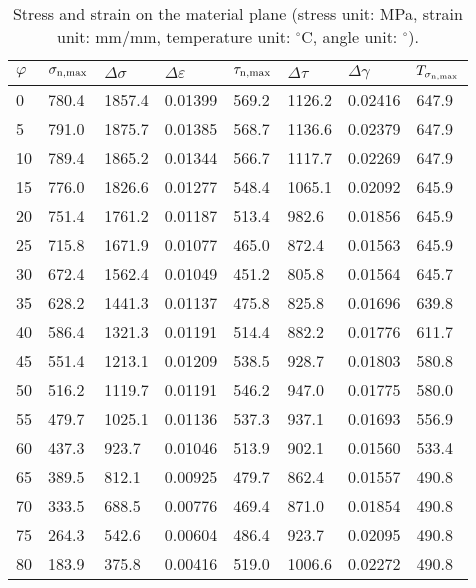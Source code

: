 \begin{table}[htbp]
  \centering
  \caption{Stress and strain on the material plane (stress unit: MPa, strain unit: mm/mm, temperature unit: $^\circ$C, angle unit: $^\circ$). }
    \begin{tabular}{p{1.5cm}p{1.5cm}p{1.5cm}p{1.5cm}p{1.5cm}p{1.5cm}p{1.5cm}p{1.5cm}}
    \toprule
    $\varphi$ & $\sigma_{\rm{n,max}}$ & $\Delta \sigma$ & $\Delta \varepsilon$ & $\tau_{\rm{n,max}}$ & $\Delta \tau$ & $\Delta \gamma$ & $T_{\sigma_{\rm{n,max}}}$ \\
    \midrule
    0     & 780.4  & 1857.4  & 0.01399  & 569.2  & 1126.2  & 0.02416  & 647.9  \\
    5     & 791.0  & 1875.7  & 0.01385  & 568.7  & 1136.6  & 0.02379  & 647.9  \\
    10    & 789.4  & 1865.2  & 0.01344  & 566.7  & 1117.7  & 0.02269  & 647.9  \\
    15    & 776.0  & 1826.6  & 0.01277  & 548.4  & 1065.1  & 0.02092  & 645.9  \\
    20    & 751.4  & 1761.2  & 0.01187  & 513.4  & 982.6  & 0.01856  & 645.9  \\
    25    & 715.8  & 1671.9  & 0.01077  & 465.0  & 872.4  & 0.01563  & 645.9  \\
    30    & 672.4  & 1562.4  & 0.01049  & 451.2  & 805.8  & 0.01564  & 645.7  \\
    35    & 628.2  & 1441.3  & 0.01137  & 475.8  & 825.8  & 0.01696  & 639.8  \\
    40    & 586.4  & 1321.3  & 0.01191  & 514.4  & 882.2  & 0.01776  & 611.7  \\
    45    & 551.4  & 1213.1  & 0.01209  & 538.5  & 928.7  & 0.01803  & 580.8  \\
    50    & 516.2  & 1119.7  & 0.01191  & 546.2  & 947.0  & 0.01775  & 580.0  \\
    55    & 479.7  & 1025.1  & 0.01136  & 537.3  & 937.1  & 0.01693  & 556.9  \\
    60    & 437.3  & 923.7  & 0.01046  & 513.9  & 902.1  & 0.01560  & 533.4  \\
    65    & 389.5  & 812.1  & 0.00925  & 479.7  & 862.4  & 0.01557  & 490.8  \\
    70    & 333.5  & 688.5  & 0.00776  & 469.4  & 871.0  & 0.01854  & 490.8  \\
    75    & 264.3  & 542.6  & 0.00604  & 486.4  & 923.7  & 0.02095  & 490.8  \\
    80    & 183.9  & 375.8  & 0.00416  & 519.0  & 1006.6  & 0.02272  & 490.8  \\

\end{tabular}
\end{table}
